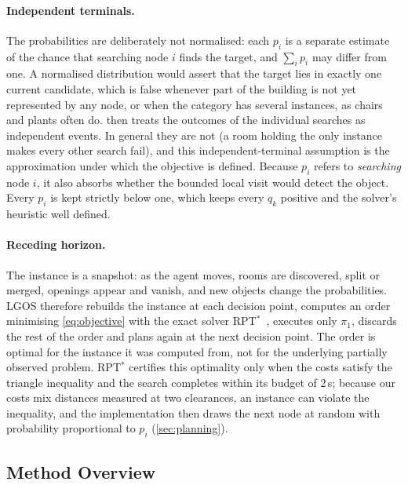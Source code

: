 \documentclass[10pt]{article}
\newcommand{\ours}{LGOS\xspace}
\begin{document}
\paragraph{Independent terminals.}
The probabilities are deliberately not normalised: each $p_i$ is a separate estimate of the chance that searching node
$i$ finds the target, and $\sum_i p_i$ may differ from one. A normalised distribution would assert that the target lies
in exactly one current candidate, which is false whenever part of the building is not yet represented by any node, or
when the category has several instances, as chairs and plants often do.  then treats the outcomes of
the individual searches as independent events. In general they are not (a room holding the only instance makes every
other search fail), and this independent-terminal assumption is the approximation under which the objective is
defined. Because $p_i$ refers to \emph{searching} node $i$, it also absorbs whether the bounded local visit would detect
the object. Every $p_i$ is kept strictly below one, which keeps every $q_k$ positive and the solver's heuristic well
defined.

\paragraph{Receding horizon.}
The instance is a snapshot: as the agent moves, rooms are discovered, split or merged, openings appear and vanish, and
new objects change the probabilities. \ours therefore rebuilds the instance at each decision point, computes an order
minimising \cref{eq:objective} with the exact solver RPT$^*$~\citep{lyu2026rpt}, executes only $\pi_1$, discards the
rest of the order and plans again at the next decision point. The order is optimal for the instance it was computed
from, not for the underlying partially observed problem. RPT$^*$ certifies this optimality only when the costs satisfy
the triangle inequality and the search completes within its budget of 2\,s; because our costs mix distances measured at
two clearances, an instance can violate the inequality, and the implementation then draws the next node at random with
probability proportional to $p_i$ (\cref{sec:planning}).

\subsection{Method Overview}
\label{sec:problem-overview}
\end{document}
